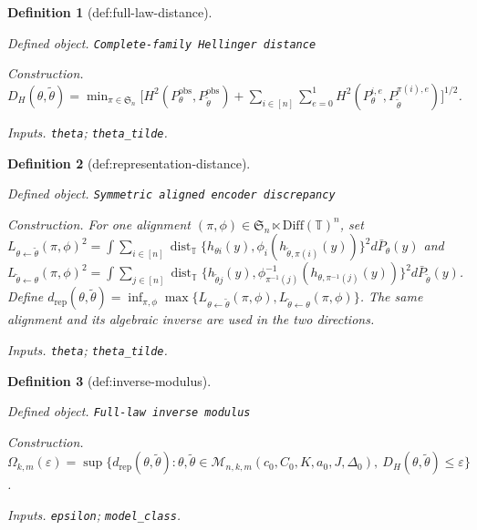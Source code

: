 \documentclass{article}
\newtheorem{definition}{Definition}
\begin{document}
\begin{definition}[def:full-law-distance]\label{def:full-law-distance}
\par\smallskip\noindent\emph{Defined object.} \texttt{Complete-\allowbreak{}family Hellinger distance}
\par\smallskip\noindent\emph{Construction.} \(D_H(\theta,\widetilde\theta)=\min_{\pi\in\mathfrak S_n}\bigl[H^2(P_\theta^{\mathrm{obs}},P_{\widetilde\theta}^{\mathrm{obs}})+\sum_{i\in[n]}\sum_{e=0}^1H^2(P_\theta^{i,e},P_{\widetilde\theta}^{\pi(i),e})\bigr]^{1/2}\).
\par\smallskip\noindent\emph{Inputs.} \texttt{theta}; \texttt{theta\_\allowbreak{}tilde}.
\end{definition}

\begin{definition}[def:representation-distance]\label{def:representation-distance}
\par\smallskip\noindent\emph{Defined object.} \texttt{Symmetric aligned encoder discrepancy}
\par\smallskip\noindent\emph{Construction.} For one alignment \((\pi,\phi)\in\mathfrak S_n\ltimes\mathrm{Diff}(\mathbb T)^n\), set \(L_{\theta\leftarrow\widetilde\theta}(\pi,\phi)^2=\int\sum_{i\in[n]}\operatorname{dist}_{\mathbb T}\{h_{\theta i}(y),\phi_i(h_{\widetilde\theta,\pi(i)}(y))\}^2d\bar P_\theta(y)\) and \(L_{\widetilde\theta\leftarrow\theta}(\pi,\phi)^2=\int\sum_{j\in[n]}\operatorname{dist}_{\mathbb T}\{h_{\widetilde\theta j}(y),\phi_{\pi^{-1}(j)}^{-1}(h_{\theta,\pi^{-1}(j)}(y))\}^2d\bar P_{\widetilde\theta}(y)\). Define \(d_{\mathrm{rep}}(\theta,\widetilde\theta)=\inf_{\pi,\phi}\max\{L_{\theta\leftarrow\widetilde\theta}(\pi,\phi),L_{\widetilde\theta\leftarrow\theta}(\pi,\phi)\}\). The same alignment and its algebraic inverse are used in the two directions.
\par\smallskip\noindent\emph{Inputs.} \texttt{theta}; \texttt{theta\_\allowbreak{}tilde}.
\end{definition}

\begin{definition}[def:inverse-modulus]\label{def:inverse-modulus}
\par\smallskip\noindent\emph{Defined object.} \texttt{Full-\allowbreak{}law inverse modulus}
\par\smallskip\noindent\emph{Construction.} \(\Omega_{k,m}(\varepsilon)=\sup\{d_{\mathrm{rep}}(\theta,\widetilde\theta):\theta,\widetilde\theta\in\mathcal M_{n,k,m}(c_0,C_0,K,a_0,J,\Delta_0),\ D_H(\theta,\widetilde\theta)\le\varepsilon\}\).
\par\smallskip\noindent\emph{Inputs.} \texttt{epsilon}; \texttt{model\_\allowbreak{}class}.
\end{definition}
\end{document}
